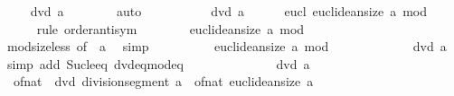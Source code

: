 \begin{isabellebody}
\ \isamarkupfalse%
\ {\isachardoublequoteopen}{\isasymnot}\ {}\ dvd\ a{\isachardoublequoteclose}\isanewline
\ \ \ \ \ \ \isamarkupfalse%
\ auto\isanewline
\ \ \isamarkupfalse%
\isanewline
\ \ \ \ \isamarkupfalse%
\ {\isachardoublequoteopen}{\isasymnot}\ {}\ dvd\ a{\isachardoublequoteclose}\isanewline
\ \ \ \ \isamarkupfalse%
\ eucl{\isacharcolon}{\kern0pt}\ {\isachardoublequoteopen}euclidean{\isacharunderscore}{\kern0pt}size\ {\isacharparenleft}{\kern0pt}a\ mod\ {}{\isacharparenright}{\kern0pt}\ {\isacharequal}{\kern0pt}\ {}{\isachardoublequoteclose}\isanewline
\ \ \ \ \isamarkupfalse%
\ {\isacharparenleft}{\kern0pt}rule\ order{\isacharunderscore}{\kern0pt}antisym{\isacharparenright}{\kern0pt}\isanewline
\ \ \ \ \ \ \isamarkupfalse%
\ {\isachardoublequoteopen}euclidean{\isacharunderscore}{\kern0pt}size\ {\isacharparenleft}{\kern0pt}a\ mod\ {}{\isacharparenright}{\kern0pt}\ {\isasymle}\ {}{\isachardoublequoteclose}\isanewline
\ \ \ \ \ \ \ \ \isamarkupfalse%
\ mod{\isacharunderscore}{\kern0pt}size{\isacharunderscore}{\kern0pt}less\ {\isacharbrackleft}{\kern0pt}of\ {}\ a{\isacharbrackright}{\kern0pt}\ \isamarkupfalse%
\ simp\isanewline
\ \ \ \ \ \ \isamarkupfalse%
\ {\isachardoublequoteopen}{}\ {\isasymle}\ euclidean{\isacharunderscore}{\kern0pt}size\ {\isacharparenleft}{\kern0pt}a\ mod\ {}{\isacharparenright}{\kern0pt}{\isachardoublequoteclose}\isanewline
\ \ \ \ \ \ \ \ \isamarkupfalse%
\ {\isacartoucheopen}{\isasymnot}\ {}\ dvd\ a{\isacartoucheclose}\ \isamarkupfalse%
\ {\isacharparenleft}{\kern0pt}simp\ add{\isacharcolon}{\kern0pt}\ Suc{\isacharunderscore}{\kern0pt}le{\isacharunderscore}{\kern0pt}eq\ dvd{\isacharunderscore}{\kern0pt}eq{\isacharunderscore}{\kern0pt}mod{\isacharunderscore}{\kern0pt}eq{\isacharunderscore}{\kern0pt}{}{\isacharparenright}{\kern0pt}\isanewline
\ \ \ \ \isamarkupfalse%
\ \isanewline
\ \ \ \ \isamarkupfalse%
\ {\isacartoucheopen}{\isasymnot}\ {}\ dvd\ a{\isacartoucheclose}\ \isamarkupfalse%
\ {\isachardoublequoteopen}{\isasymnot}\ of{\isacharunderscore}{\kern0pt}nat\ {}\ dvd\ division{\isacharunderscore}{\kern0pt}segment\ a\ {\isacharasterisk}{\kern0pt}\ of{\isacharunderscore}{\kern0pt}nat\ {\isacharparenleft}{\kern0pt}euclidean{\isacharunderscore}{\kern0pt}size\ a{\isacharparenright}{\kern0pt}{\isachardoublequoteclose}\isanewline

\end{isabellebody}
